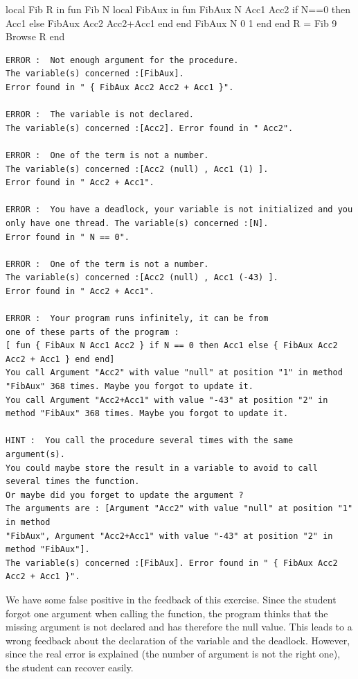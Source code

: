 \documentclass[11pt,a4paper,twoside,openright]{report}
\begin{document}
\begin{OZ}
local Fib R in
    fun {Fib N}
        local FibAux in
            fun {FibAux N Acc1 Acc2}
				if N==0 then Acc1
				else
			    {FibAux Acc2 Acc2+Acc1}
				end			
			end
        	 {FibAux N 0 1}
		end
    	end
	R = {Fib 9}
	{Browse R}
end
\end{OZ}

\begin{lstlisting}
ERROR :  Not enough argument for the procedure. 
The variable(s) concerned :[FibAux]. 
Error found in " { FibAux Acc2 Acc2 + Acc1 }".

ERROR :  The variable is not declared. 
The variable(s) concerned :[Acc2]. Error found in " Acc2".

ERROR :  One of the term is not a number. 
The variable(s) concerned :[Acc2 (null) , Acc1 (1) ]. 
Error found in " Acc2 + Acc1".

ERROR :  You have a deadlock, your variable is not initialized and you 
only have one thread. The variable(s) concerned :[N]. 
Error found in " N == 0".

ERROR :  One of the term is not a number. 
The variable(s) concerned :[Acc2 (null) , Acc1 (-43) ]. 
Error found in " Acc2 + Acc1".

ERROR :  Your program runs infinitely, it can be from 
one of these parts of the program : 
[ fun { FibAux N Acc1 Acc2 } if N == 0 then Acc1 else { FibAux Acc2 Acc2 + Acc1 } end end]
You call Argument "Acc2" with value "null" at position "1" in method "FibAux" 368 times. Maybe you forgot to update it.
You call Argument "Acc2+Acc1" with value "-43" at position "2" in method "FibAux" 368 times. Maybe you forgot to update it.

HINT :  You call the procedure several times with the same argument(s). 
You could maybe store the result in a variable to avoid to call several times the function. 
Or maybe did you forget to update the argument ? 
The arguments are : [Argument "Acc2" with value "null" at position "1" in method 
"FibAux", Argument "Acc2+Acc1" with value "-43" at position "2" in method "FibAux"].
The variable(s) concerned :[FibAux]. Error found in " { FibAux Acc2 Acc2 + Acc1 }".

\end{lstlisting}

We have some false positive in the feedback of this exercise. Since the student 
forgot one argument when calling the function, the program thinks that the 
missing argument is not declared and has therefore the null value. This leads 
to 
a wrong feedback about the declaration of the variable and the deadlock. 
However, since the real error is explained (the number of argument is not the 
right one), the student can recover easily.
\end{document}
